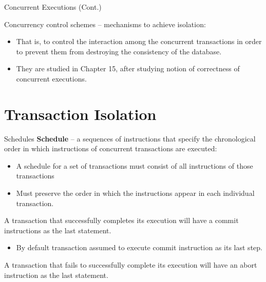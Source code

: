\documentclass{beamer}
\begin{document}
\begin{frame}{Concurrent Executions (Cont.)}

    Concurrency control schemes – mechanisms to achieve isolation:
        \begin{itemize}
            \item That is, to control the interaction among the concurrent transactions in order to prevent them from destroying the consistency of the database.
            \item They are studied in Chapter 15, after studying notion of correctness of concurrent executions.
        \end{itemize}

\end{frame}

\section{Transaction Isolation}

\begin{frame}{Schedules}
    \textbf{Schedule} – a sequences of instructions that specify the chronological order in which instructions of concurrent transactions are executed:
        \begin{itemize}
            \item A schedule for a set of transactions must consist of all instructions of those transactions
            \item Must preserve the order in which the instructions appear in each individual transaction.
        \end{itemize}

    A transaction that successfully completes its execution will have a commit instructions as the last statement.
        \begin{itemize}
            \item By default transaction assumed to execute commit instruction as its last step.
        \end{itemize}

    A transaction that fails to successfully complete its execution will have an abort instruction as the last statement.
\end{frame}
\end{document}
